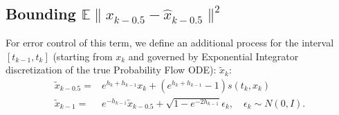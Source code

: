 \documentclass{article}
\newcommand{\E}{\mathbb{E}}
\begin{document}
\subsection{Bounding $\E\|x_{k-0.5}-\hat{x}_{k-0.5}\|^2$}
\noindent
{For error control of this term, we define an additional process for the interval $[t_{k-1},t_k]$ (starting from $x_k$ and governed by Exponential Integrator discretization of the true Probability Flow ODE): $\tilde{x}_{k}$:
 \begin{align}
  \tilde{x}_{k-0.5} = &
 e^{h_k + h_{k-1}} x_{k} +
 (e^{h_k + h_{k-1}}-1) 
 s(t_{k},x_{{k}}) \label{discretized_true_first}\\
  \tilde{x}_{k-1} 
  =& e^{-h_{k-1}} \tilde{x}_{k-0.5} 
 + \sqrt{1-e^{-2 h_{k-1}}} \epsilon_k , \quad \epsilon_k \sim N(0,I) \label{discretized_true_second} .
\end{align}}
\end{document}
